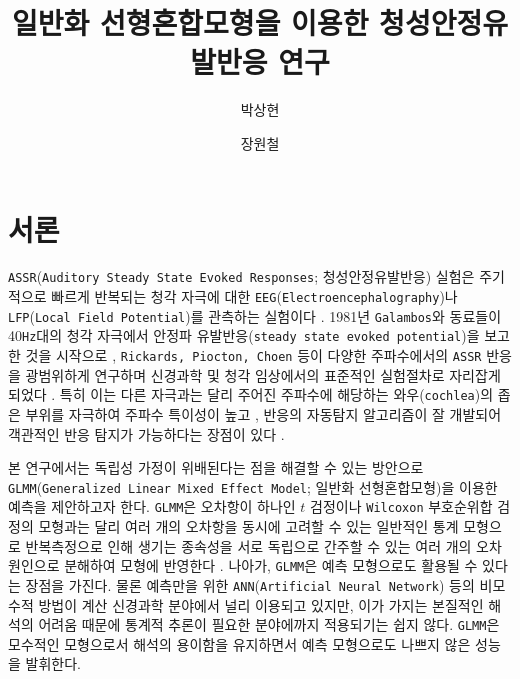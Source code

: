 \documentclass[11pt,onecolumn,twoside,a4size]{gsag3jnl}
\title{일반화 선형혼합모형을 이용한 청성안정유발반응 연구}
\author[1]{박상현}
\author[$\ast$,1]{장원철}
\affil[]{대한민국 서울특별시 08826, 서울대학교 자연과학대학 통계학과}
\affil[$\ast$]{지도교수}
\begin{document}
\maketitle
\thispagestyle{firststyle}
\logomark
\marginmark
\firstpagefootnote

\vspace{-34pt}%

\section{서론}

\texttt{ASSR}(\texttt{Auditory Steady State Evoked Responses}; 청성안정유발반응) 실험은 주기적으로 빠르게 반복되는 청각 자극에 대한 \texttt{EEG}(\texttt{Electroencephalography})나 \texttt{LFP}(\texttt{Local Field Potential})를 관측하는 실험이다 \texttt{\citep{bohorquez2008generation}}. 1981년 \texttt{Galambos}와 동료들이 40\texttt{Hz}대의 청각 자극에서 안정파 유발반응(\texttt{steady state evoked potential})을 보고한 것을 시작으로 \texttt{\citep{galambos198140}}, \texttt{Rickards, Piocton, Choen} 등이 다양한 주파수에서의 \texttt{ASSR} 반응을 광범위하게 연구하며 신경과학 및 청각 임상에서의 표준적인 실험절차로 자리잡게 되었다 \texttt{\citep{rickards1982steady, picton1987potentials, kuwada1986scalp, cohen1991comparison}}. 특히 이는 다른 자극과는 달리 주어진 주파수에 해당하는 와우(\texttt{cochlea})의 좁은 부위를 자극하여 주파수 특이성이 높고 \texttt{\citep{john2000master}}, 반응의 자동탐지 알고리즘이 잘 개발되어 객관적인 반응 탐지가 가능하다는 장점이 있다 \texttt{\citep{cone2002auditory}}.
 
본 연구에서는 독립성 가정이 위배된다는 점을 해결할 수 있는 방안으로 \texttt{GLMM}(\texttt{Generalized Linear Mixed Effect Model}; 일반화 선형혼합모형)을 이용한 예측을 제안하고자 한다. \texttt{GLMM}은 오차항이 하나인 $t$ 검정이나 \texttt{Wilcoxon} 부호순위합 검정의 모형과는 달리 여러 개의 오차항을 동시에 고려할 수 있는 일반적인 통계 모형으로 반복측정으로 인해 생기는 종속성을 서로 독립으로 간주할 수 있는 여러 개의 오차 원인으로 분해하여 모형에 반영한다 \texttt{\citep{pinheiro2006mixed, agresti2000random}}. 나아가, \texttt{GLMM}은 예측 모형으로도 활용될 수 있다는 장점을 가진다. 물론 예측만을 위한 \texttt{ANN}(\texttt{Artificial Neural Network}) 등의 비모수적 방법이 계산 신경과학 분야에서 널리 이용되고 있지만, 이가 가지는 본질적인 해석의 어려움 때문에 통계적 추론이 필요한 분야에까지 적용되기는 쉽지 않다. \texttt{GLMM}은 모수적인 모형으로서 해석의 용이함을 유지하면서 예측 모형으로도 나쁘지 않은 성능을 발휘한다.
\end{document}
